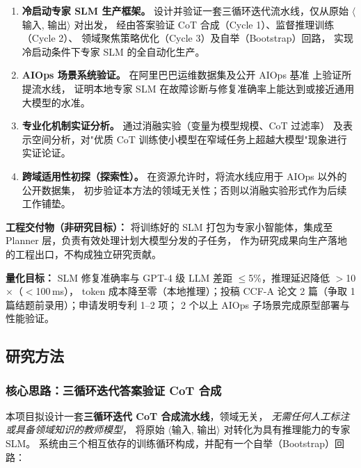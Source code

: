 \documentclass[lang=cn,a4paper,newtx,bibend=bibtex]{elegantpaper}
\begin{document}
\begin{enumerate}[leftmargin=*, label=\textbf{O\arabic*.}, itemsep=3pt]
  \item \textbf{冷启动专家 SLM 生产框架。}
        设计并验证一套三循环迭代流水线，仅从原始 $\langle$输入, 输出$\rangle$ 对出发，
        经由答案验证 CoT 合成（Cycle 1）、监督推理训练（Cycle 2）、
        领域聚焦策略优化（Cycle 3）及自举（Bootstrap）回路，
        实现冷启动条件下专家 SLM 的全自动化生产。
  \item \textbf{AIOps 场景系统验证。}
        在阿里巴巴运维数据集及公开 AIOps 基准 \parencite{aiops} 上验证所提流水线，
        证明本地专家 SLM 在故障诊断与修复准确率上能达到或接近通用大模型的水准。
  \item \textbf{专业化机制实证分析。}
        通过消融实验（变量为模型规模、CoT 过滤率）
        及表示空间分析，对"优质 CoT 训练使小模型在窄域任务上超越大模型"现象进行实证论证。
  \item \textbf{跨域适用性初探（探索性）。}
        在资源允许时，将流水线应用于 AIOps 以外的公开数据集，
        初步验证本方法的领域无关性；否则以消融实验形式作为后续工作铺垫。
\end{enumerate}

\noindent\textbf{工程交付物（非研究目标）：}
将训练好的 SLM 打包为专家小智能体，集成至 Planner 层，负责有效处理计划大模型分发的子任务，
作为研究成果向生产落地的工程出口，不构成独立研究贡献。

\noindent\textbf{量化目标：}
SLM 修复准确率与 GPT-4 级 LLM 差距 $\leq$5\%，推理延迟降低 $>$10$\times$（$<$100\,ms），
token 成本降至零（本地推理）；投稿 CCF-A 论文 2 篇（争取 1 篇结题前录用）；申请发明专利 1--2 项；
2 个以上 AIOps 子场景完成原型部署与性能验证。

\subsection{研究方法}

\subsubsection*{核心思路：三循环迭代答案验证 CoT 合成}

本项目拟设计一套\textbf{三循环迭代 CoT 合成流水线}，领域无关，
\emph{无需任何人工标注或具备领域知识的教师模型}，
将原始 $\langle$输入, 输出$\rangle$ 对转化为具有推理能力的专家 SLM。
系统由三个相互依存的训练循环构成，并配有一个自举（Bootstrap）回路：
\end{document}
